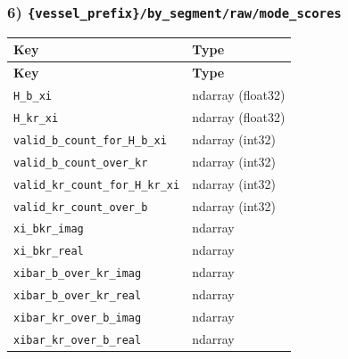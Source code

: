 \documentclass[11pt]{article}
\begin{document}
\subsubsection*{6) \texttt{\{vessel\_\allowbreak{}prefix\}/\allowbreak{}by\_\allowbreak{}segment/\allowbreak{}raw/\allowbreak{}mode\_\allowbreak{}scores}}
\begin{longtable}{|p{}|p{}|}
\hline
\textbf{Key} & \textbf{Type} \\ \hline
\endfirsthead
\hline
\textbf{Key} & \textbf{Type} \\ \hline
\endhead
\texttt{H\_\allowbreak{}b\_\allowbreak{}xi} & ndarray (float32) \\ \hline
\texttt{H\_\allowbreak{}kr\_\allowbreak{}xi} & ndarray (float32) \\ \hline
\texttt{valid\_\allowbreak{}b\_\allowbreak{}count\_\allowbreak{}for\_\allowbreak{}H\_\allowbreak{}b\_\allowbreak{}xi} & ndarray (int32) \\ \hline
\texttt{valid\_\allowbreak{}b\_\allowbreak{}count\_\allowbreak{}over\_\allowbreak{}kr} & ndarray (int32) \\ \hline
\texttt{valid\_\allowbreak{}kr\_\allowbreak{}count\_\allowbreak{}for\_\allowbreak{}H\_\allowbreak{}kr\_\allowbreak{}xi} & ndarray (int32) \\ \hline
\texttt{valid\_\allowbreak{}kr\_\allowbreak{}count\_\allowbreak{}over\_\allowbreak{}b} & ndarray (int32) \\ \hline
\texttt{xi\_\allowbreak{}bkr\_\allowbreak{}imag} & ndarray \\ \hline
\texttt{xi\_\allowbreak{}bkr\_\allowbreak{}real} & ndarray \\ \hline
\texttt{xibar\_\allowbreak{}b\_\allowbreak{}over\_\allowbreak{}kr\_\allowbreak{}imag} & ndarray \\ \hline
\texttt{xibar\_\allowbreak{}b\_\allowbreak{}over\_\allowbreak{}kr\_\allowbreak{}real} & ndarray \\ \hline
\texttt{xibar\_\allowbreak{}kr\_\allowbreak{}over\_\allowbreak{}b\_\allowbreak{}imag} & ndarray \\ \hline
\texttt{xibar\_\allowbreak{}kr\_\allowbreak{}over\_\allowbreak{}b\_\allowbreak{}real} & ndarray \\ \hline
\end{longtable}
\end{document}

